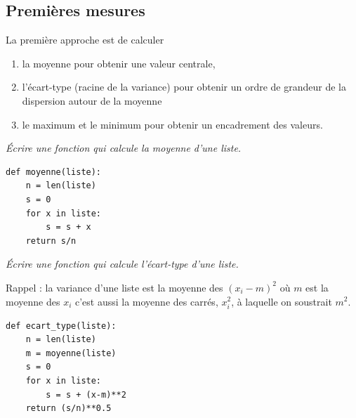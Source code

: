 \subsection{Premières mesures}
La première approche est de calculer
\begin{enumerate}
    \item la moyenne pour obtenir une valeur centrale, 
    \item l'écart-type (racine de la variance) pour obtenir un ordre de grandeur de la dispersion autour de la moyenne
    \item le maximum et le minimum pour obtenir un encadrement des valeurs.
\end{enumerate}
\begin{Exercise}\it Écrire une fonction  qui calcule la moyenne d'une liste.
\end{Exercise}
\begin{Answer}
\begin{lstlisting}
def moyenne(liste):
    n = len(liste)
    s = 0
    for x in liste:
        s = s + x
    return s/n
\end{lstlisting}
\end{Answer}
\begin{Exercise}\it Écrire une fonction  qui calcule l'écart-type d'une liste.

Rappel : la variance d'une liste est la moyenne des $(x_i-m)^2$ où $m$ est la moyenne des $x_i$ c'est aussi la moyenne des carrés, $x_i^2$, à laquelle on soustrait $m^2$.
\end{Exercise}
\begin{Answer}
\begin{lstlisting}
def ecart_type(liste):
    n = len(liste)
    m = moyenne(liste)
    s = 0
    for x in liste:
        s = s + (x-m)**2
    return (s/n)**0.5
\end{lstlisting}
\end{Answer}

